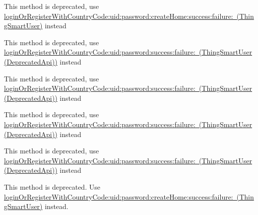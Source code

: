 \begin{DoxyRefList}
\label{deprecated__deprecated000214}%
%
This method is deprecated, use \mbox{\hyperlink{interface_thing_smart_user_a2e848d4067bc3e9aed5a7db187ceecd6}{login\+Or\+Register\+With\+Country\+Code\+:uid\+:password\+:create\+Home\+:success\+:failure\+: (\+Thing\+Smart\+User)}} instead  
\item[(Deprecated\+Api) Member \mbox{\hyperlink{category_thing_smart_user_07_deprecated_api_08_a5d495b0c1de2e02268e3672d65605d7b}{\mbox{[}Thing\+Smart\+User(Deprecated\+Api) login\+Or\+Register\+By\+Phone\+:uid\+:password\+:success\+:failure\+:\mbox{]}}} ]\label{deprecated__deprecated000213}%
%
This method is deprecated, use \mbox{\hyperlink{category_thing_smart_user_07_deprecated_api_08_a4fb9e3f67dd978624e24b7d47254d271}{login\+Or\+Register\+With\+Country\+Code\+:uid\+:password\+:success\+:failure\+: (\+Thing\+Smart\+User(\+Deprecated\+Api))}} instead 

\label{deprecated__deprecated000203}%
%
This method is deprecated, use \mbox{\hyperlink{category_thing_smart_user_07_deprecated_api_08_a4fb9e3f67dd978624e24b7d47254d271}{login\+Or\+Register\+With\+Country\+Code\+:uid\+:password\+:success\+:failure\+: (\+Thing\+Smart\+User(\+Deprecated\+Api))}} instead 

\label{deprecated__deprecated000223}%
%
This method is deprecated, use \mbox{\hyperlink{category_thing_smart_user_07_deprecated_api_08_a4fb9e3f67dd978624e24b7d47254d271}{login\+Or\+Register\+With\+Country\+Code\+:uid\+:password\+:success\+:failure\+: (\+Thing\+Smart\+User(\+Deprecated\+Api))}} instead 

\label{deprecated__deprecated000233}%
%
This method is deprecated, use \mbox{\hyperlink{category_thing_smart_user_07_deprecated_api_08_a4fb9e3f67dd978624e24b7d47254d271}{login\+Or\+Register\+With\+Country\+Code\+:uid\+:password\+:success\+:failure\+: (\+Thing\+Smart\+User(\+Deprecated\+Api))}} instead  
\item[(Deprecated\+Api) Member \mbox{\hyperlink{category_thing_smart_user_07_deprecated_api_08_a4fb9e3f67dd978624e24b7d47254d271}{\mbox{[}Thing\+Smart\+User(Deprecated\+Api) login\+Or\+Register\+With\+Country\+Code\+:uid\+:password\+:success\+:failure\+:\mbox{]}}} ]\label{deprecated__deprecated000227}%
%
This method is deprecated. Use \mbox{\hyperlink{interface_thing_smart_user_a2e848d4067bc3e9aed5a7db187ceecd6}{login\+Or\+Register\+With\+Country\+Code\+:uid\+:password\+:create\+Home\+:success\+:failure\+: (\+Thing\+Smart\+User)}} instead. 


\end{DoxyRefList}
